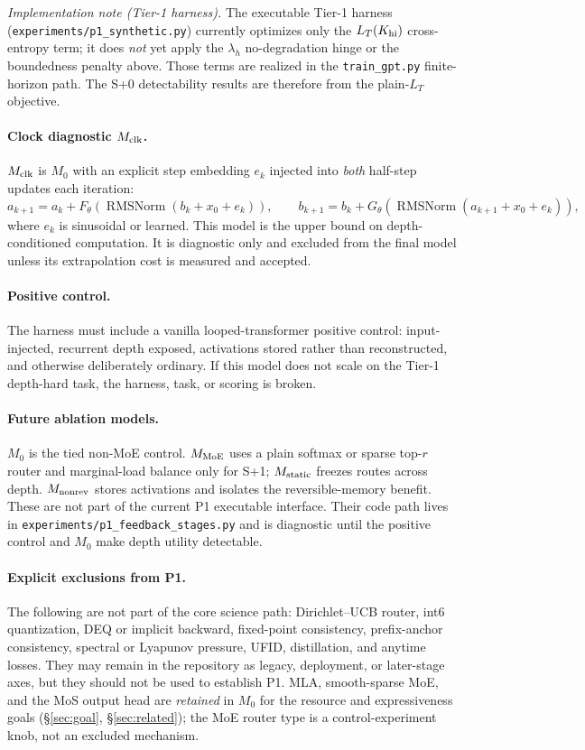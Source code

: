 \documentclass[11pt]{article}
\newcommand{\RMSNorm}{\operatorname{RMSNorm}}
\newcommand{\code}[1]{\texttt{#1}}
\begin{document}
\emph{Implementation note (Tier-1 harness).}  The executable Tier-1 harness
(\code{experiments/p1\_synthetic.py}) currently optimizes only the
\(L_T(K_{\rm hi})\) cross-entropy term; it does \emph{not} yet apply the
\(\lambda_h\) no-degradation hinge or the boundedness penalty above.  Those terms
are realized in the \code{train\_gpt.py} finite-horizon path.  The S+0 detectability
results are therefore from the plain-\(L_T\) objective.

\paragraph{Clock diagnostic \(M_{\rm clk}\).}
\(M_{\rm clk}\) is \(M_0\) with an explicit step embedding \(e_k\) injected into
\emph{both} half-step updates each iteration:
\[
  a_{k+1}=a_k+F_\theta\!\left(\RMSNorm(b_k+x_0+e_k)\right),\qquad
  b_{k+1}=b_k+G_\theta\!\left(\RMSNorm(a_{k+1}+x_0+e_k)\right),
\]
where \(e_k\) is sinusoidal or learned.  This model is the upper bound on depth-conditioned
computation.  It is diagnostic only and excluded from the final model unless its extrapolation cost
is measured and accepted.

\paragraph{Positive control.}
The harness must include a vanilla looped-transformer positive control: input-injected, recurrent
depth exposed, activations stored rather than reconstructed, and otherwise deliberately ordinary.
If this model does not scale on the Tier-1 depth-hard task, the harness, task, or scoring is broken.

\paragraph{Future ablation models.}
\(M_0\) is the tied non-MoE control.  \(M_{\rm MoE}\) uses a plain softmax or sparse top-\(r\)
router and marginal-load balance only for S+1; \(M_{\rm static}\) freezes routes across depth.
\(M_{\rm nonrev}\) stores activations and isolates the reversible-memory benefit.  These are not
part of the current P1 executable interface.  Their code path lives in
\code{experiments/p1\_feedback\_stages.py} and is diagnostic until the positive control and \(M_0\)
make depth utility detectable.

\paragraph{Explicit exclusions from P1.}
The following are not part of the core science path: Dirichlet--UCB router, int6 quantization, DEQ or
implicit backward, fixed-point consistency, prefix-anchor consistency, spectral or Lyapunov pressure,
UFID, distillation, and anytime losses.  They may remain in the repository as legacy, deployment, or
later-stage axes, but they should not be used to establish P1.  MLA, smooth-sparse MoE, and the MoS
output head are \emph{retained} in \(M_0\) for the resource and expressiveness goals
(\S\ref{sec:goal}, \S\ref{sec:related}); the MoE router type is a control-experiment knob, not an
excluded mechanism.
\end{document}
